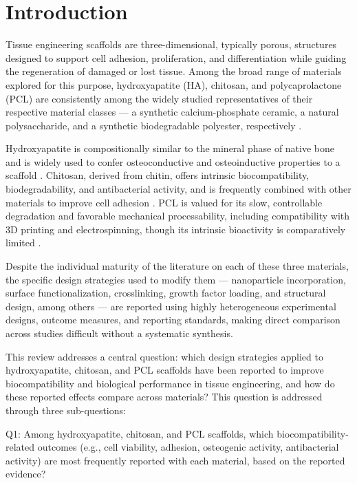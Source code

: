 \documentclass[5p,times,twocolumn]{elsarticle}
\begin{document}
\section{Introduction}
\label{sec:intro}

Tissue engineering scaffolds are three-dimensional, typically porous, structures designed to support cell adhesion, proliferation, and differentiation while guiding the regeneration of damaged or lost tissue. Among the broad range of materials explored for this purpose, hydroxyapatite (HA), chitosan, and polycaprolactone (PCL) are consistently among the widely studied representatives of their respective material classes --- a synthetic calcium-phosphate ceramic, a natural polysaccharide, and a synthetic biodegradable polyester, respectively \cite{ref79}.

Hydroxyapatite is compositionally similar to the mineral phase of native bone and is widely used to confer osteoconductive and osteoinductive properties to a scaffold \cite{ref80}. Chitosan, derived from chitin, offers intrinsic biocompatibility, biodegradability, and antibacterial activity, and is frequently combined with other materials to improve cell adhesion \cite{ref81}. PCL is valued for its slow, controllable degradation and favorable mechanical processability, including compatibility with 3D printing and electrospinning, though its intrinsic bioactivity is comparatively limited \cite{ref82}.

Despite the individual maturity of the literature on each of these three materials, the specific design strategies used to modify them --- nanoparticle incorporation, surface functionalization, crosslinking, growth factor loading, and structural design, among others --- are reported using highly heterogeneous experimental designs, outcome measures, and reporting standards, making direct comparison across studies difficult without a systematic synthesis.

This review addresses a central question: which design strategies applied to hydroxyapatite, chitosan, and PCL scaffolds have been reported to improve biocompatibility and biological performance in tissue engineering, and how do these reported effects compare across materials? This question is addressed through three sub-questions:

Q1: Among hydroxyapatite, chitosan, and PCL scaffolds, which biocompatibility-related outcomes (e.g., cell viability, adhesion, osteogenic activity, antibacterial activity) are most frequently reported with each material, based on the reported evidence?
\end{document}
